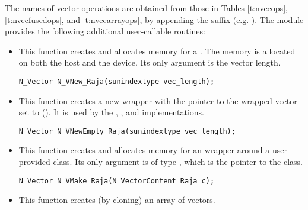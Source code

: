 The names of vector operations are obtained from those in Tables \ref{t:nvecops},
\ref{t:nvecfusedops}, and \ref{t:nvecarrayops}, by appending the suffix 
(e.g. ).
The module {\nvecraja}  provides the following additional user-callable routines:
\begin{itemize}

  

\item {}
 
  This function creates and allocates memory for a {\raja} .
  The memory is allocated on both the host and the device. Its only argument is the 
  vector length. 

\begin{verbatim}
N_Vector N_VNew_Raja(sunindextype vec_length);
\end{verbatim}

  

\item {}
 
  This function creates a new {\nvector} wrapper with the pointer to
  the wrapped {\raja} vector set to (). It is used by the 
  , , and  
  implementations. 

\begin{verbatim}
N_Vector N_VNewEmpty_Raja(sunindextype vec_length);
\end{verbatim}

  

\item {}
  
  This function creates and allocates memory for an {\nvecraja}
  wrapper around a user-provided  class. 
  Its only argument is of type , which
  is the pointer to the class.

\begin{verbatim}
N_Vector N_VMake_Raja(N_VectorContent_Raja c);
\end{verbatim}



\item {}
 
  This function creates (by cloning) an array of  {\nvecraja} vectors.
 

\end{itemize}
